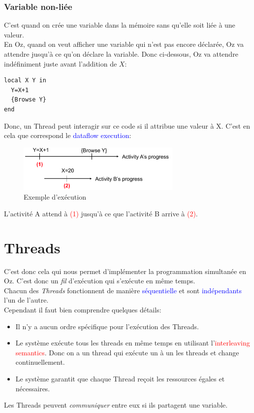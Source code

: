 \documentclass{report}
\begin{document}
\subsubsection{Variable non-liée}
C'est quand on crée une variable dans la mémoire sans qu'elle soit liée à une valeur.\\
En Oz, quand on veut afficher une variable qui n'est pas encore déclarée, Oz va attendre jusqu'à ce qu'on déclare la variable. Donc ci-dessous, Oz va attendre indéfiniment juste avant l'addition de $X$:
\begin{lstlisting}[escapechar=\%]
local X Y in
  Y=X+1
  {Browse Y}
end
\end{lstlisting}
Donc, un Thread peut interagir sur ce code si il attribue une valeur à X. C'est en cela que correspond le \textcolor{blue}{dataflow execution}:
\begin{figure}[H]
\centering
\includegraphics[width=8cm]{img/dataflow.png}
\caption{Exemple d'exécution}
\end{figure}
L'activité A attend à \textcolor{red}{(1)} jusqu'à ce que l'activité B arrive à \textcolor{red}{(2)}.

\section{Threads}
C'est donc cela qui nous permet d'implémenter la programmation simultanée en Oz. C'est donc un \textit{fil} d'exécution qui s'exécute en même temps.\\
Chacun des \textit{Threads} fonctionnent de manière \textcolor{blue}{séquentielle} et sont \textcolor{blue}{indépendants} l'un de l'autre.\\
Cependant il faut bien comprendre quelques détails:
\begin{itemize}
\item Il n'y a aucun ordre spécifique pour l'exécution des Threads.
\item Le système exécute tous les threads en même temps en utilisant l'\textcolor{red}{interleaving semantics}. Donc on a un thread qui exécute un à un les threads et change continuellement.
\item Le système garantit que chaque Thread reçoit les ressources égales et nécessaires.
\end{itemize}
Les Threads peuvent \textit{communiquer} entre eux si ils partagent une variable.\\
\end{document}
